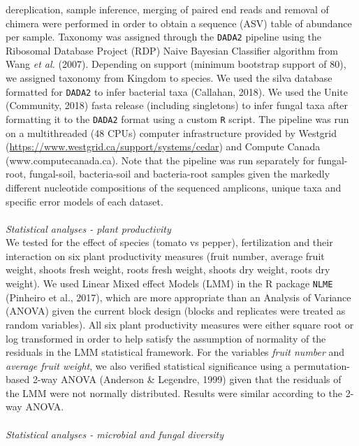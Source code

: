 \documentclass[12pt,]{article}
\begin{document}
dereplication, sample inference, merging of paired end reads and removal
of chimera were performed in order to obtain a sequence (ASV) table of
abundance per sample. Taxonomy was assigned through the \texttt{DADA2}
pipeline using the Ribosomal Database Project (RDP) Naive Bayesian
Classifier algorithm from Wang \emph{et al.} (2007). Depending on
support (minimum bootstrap support of 80), we assigned taxonomy from
Kingdom to species. We used the silva database formatted for
\texttt{DADA2} to infer bacterial taxa (Callahan, 2018). We used the
Unite (Community, 2018) fasta release (including singletons) to infer
fungal taxa after formatting it to the \texttt{DADA2} format using a
custom \texttt{R} script. The pipeline was run on a multithreaded (48
CPUs) computer infrastructure provided by Westgrid
(\url{https://www.westgrid.ca/support/systems/cedar}) and Compute Canada
(www.computecanada.ca). Note that the pipeline was run separately for
fungal-root, fungal-soil, bacteria-soil and bacteria-root samples given
the markedly different nucleotide compositions of the sequenced
amplicons, unique taxa and specific error models of each dataset. ~\\
\hspace*{0.333em}\\
\emph{Statistical analyses - plant productivity}\\
We tested for the effect of species (tomato vs pepper), fertilization
and their interaction on six plant productivity measures (fruit number,
average fruit weight, shoots fresh weight, roots fresh weight, shoots
dry weight, roots dry weight). We used Linear Mixed effect Models (LMM)
in the R package \texttt{NLME} (Pinheiro et al., 2017), which are more
appropriate than an Analysis of Variance (ANOVA) given the current block
design (blocks and replicates were treated as random variables). All six
plant productivity measures were either square root or log transformed
in order to help satisfy the assumption of normality of the residuals in
the LMM statistical framework. For the variables \emph{fruit number} and
\emph{average fruit weight}, we also verified statistical significance
using a permutation-based 2-way ANOVA (Anderson \& Legendre, 1999) given
that the residuals of the LMM were not normally distributed. Results
were similar according to the 2-way ANOVA.\\
\hspace*{0.333em}\\
\emph{Statistical analyses - microbial and fungal diversity}\\
\end{document}
